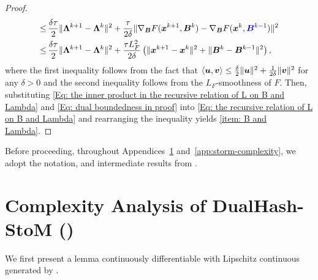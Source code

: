 \begin{proof}
\begin{align}
        \leq & \, \frac{\delta\tau}{2}\|\bm{\Lambda}^{k+1}- \bm{\Lambda}^{k}\|^{2}+ \frac{\tau}{2\delta}\|\nabla_{\bm{B}}F(\bm{x}^{k+1}, \bm{B}^{k}) - \nabla_{\bm{B}}F(\bm{x}^{k}, {\color{blue}\bm{B}^{k-1}}) \|^{2} \notag \\
        \leq & \, \frac{\delta\tau}{2}\|\bm{\Lambda}^{k+1}- \bm{\Lambda}^{k}\|^{2}+ \frac{\tau L_{F}^{2}}{2\delta}\left( \|\bm{x}^{k+1}- \bm{x}^{k}\|^{2}+ \|\bm{B}^{k}- \bm{B}^{k-1}\|^{2}\right),
    \end{align}
    where the first inequality follows from the fact that
    $\langle \bm{u}, \bm{v} \rangle \leq \frac{\delta}{2}\|\bm{u}\|^{2}+ \frac{1}{2\delta}\|\bm{v}\|^{2}$ for any $\delta >0$ and the second inequality follows from the $L_F$-smoothness of $F$. Then,  substituting \eqref{Eq: the inner product in the recursive relation of L on B and Lambda}
    and \eqref{Eq: dual boundedness in proof} into \eqref{Eq: the recursive relation of L on B and Lambda}
    and rearranging the inequality yields \eqref{item: B and Lambda}.
\end{proof}

Before proceeding, throughout Appendices~\ref{app:stom-complexity} and~\ref{app:storm-complexity}, we adopt the notation,  and intermediate results from . 

\section{Complexity Analysis of DualHash-StoM (\texorpdfstring{}{Algorithm 1})}
\label{app:stom-complexity}

We first present a lemma  continuously differentiable  with Lipschitz continuous  generated by .

